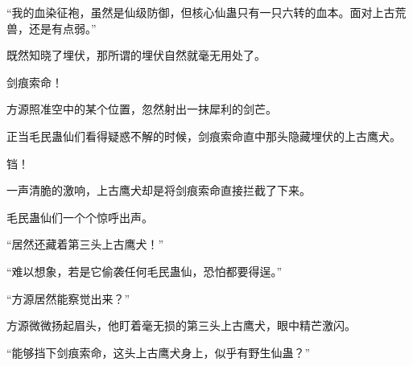 \begin{this_body}
“我的血染征袍，虽然是仙级防御，但核心仙蛊只有一只六转的血本。面对上古荒兽，还是有点弱。”

既然知晓了埋伏，那所谓的埋伏自然就毫无用处了。

剑痕索命！

方源照准空中的某个位置，忽然射出一抹犀利的剑芒。

正当毛民蛊仙们看得疑惑不解的时候，剑痕索命直中那头隐藏埋伏的上古鹰犬。

铛！

一声清脆的激响，上古鹰犬却是将剑痕索命直接拦截了下来。

毛民蛊仙们一个个惊呼出声。

“居然还藏着第三头上古鹰犬！”

“难以想象，若是它偷袭任何毛民蛊仙，恐怕都要得逞。”

“方源居然能察觉出来？”

方源微微扬起眉头，他盯着毫无损的第三头上古鹰犬，眼中精芒激闪。

“能够挡下剑痕索命，这头上古鹰犬身上，似乎有野生仙蛊？”

\end{this_body}

